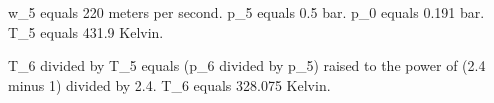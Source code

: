 w_5 equals 220 meters per second.  
p_5 equals 0.5 bar.  
p_0 equals 0.191 bar.  
T_5 equals 431.9 Kelvin.  

T_6 divided by T_5 equals (p_6 divided by p_5) raised to the power of (2.4 minus 1) divided by 2.4.  
T_6 equals 328.075 Kelvin.